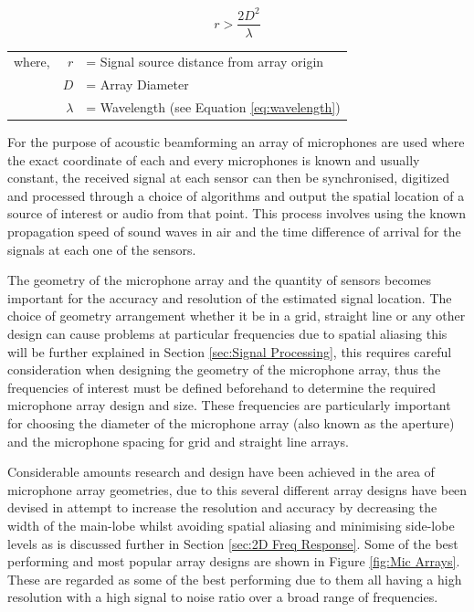 \documentclass{UoNMCHA}
\numberwithin{equation}{section}
\begin{document}
    \begin{equation}
        r > \frac{2D^2}{\lambda}
        \label{eq:propogate}
    \end{equation}
    \begin{table}[H]
    \centering
        \begin{tabular}{lrl}
            where, & $r$ &= Signal source distance from array origin \\
             & $D$ &= Array Diameter \\
             & $\lambda$ &= Wavelength (see Equation \ref{eq:wavelength})
        \end{tabular}
    \end{table}
    
    For the purpose of acoustic beamforming an array of microphones are used where the exact coordinate of each and every microphones is known and usually constant, the received signal at each sensor can then be synchronised, digitized and processed through a choice of algorithms and output the spatial location of a source of interest or audio from that point. This process involves using the known propagation speed of sound waves in air and the time difference of arrival for the signals at each one of the sensors.
    
    The geometry of the microphone array and the quantity of sensors becomes important for the accuracy and resolution of the estimated signal location. The choice of geometry arrangement whether it be in a grid, straight line or any other design can cause problems at particular frequencies due to spatial aliasing this will be further explained in Section \ref{sec:Signal Processing}, this requires careful consideration when designing the geometry of the microphone array, thus the frequencies of interest must be defined beforehand to determine the required microphone array design and size. These frequencies are particularly important for choosing the diameter of the microphone array (also known as the aperture) and the microphone spacing for grid and straight line arrays.
    
    Considerable amounts research and design have been achieved in the area of microphone array geometries, due to this several different array designs have been devised in attempt to increase the resolution and accuracy by decreasing the width of the main-lobe whilst avoiding spatial aliasing and minimising side-lobe levels as is discussed further in Section \ref{sec:2D Freq Response}. Some of the best performing and most popular array designs are shown in Figure \ref{fig:Mic Arrays}. These are regarded as some of the best performing due to them all having a high resolution with a high signal to noise ratio over a broad range of frequencies.
    
\end{document}
